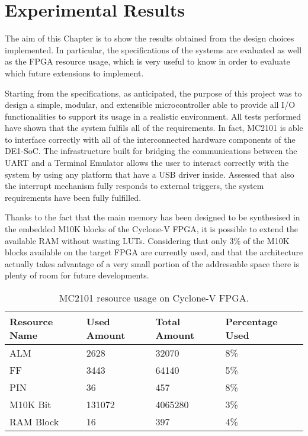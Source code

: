 \chapter{Experimental Results}
The aim of this Chapter is to show the results obtained from the design choices implemented. In particular, the specifications of the systems are evaluated as well as the FPGA resource usage, which is very useful to know in order to evaluate which future extensions to implement.

Starting from the specifications, as anticipated, the purpose of this project was to design a simple, modular, and extensible microcontroller able to provide all I/O functionalities to support its usage in a realistic environment. All tests performed have shown that the system fulfils all of the requirements. In fact, MC2101 is able to interface correctly with all of the interconnected hardware components of the DE1-SoC. The infrastructure built for bridging the communications between the UART and a Terminal Emulator allows the user to interact correctly with the system by using any platform that have a USB driver inside. Assessed that also the interrupt mechanism fully responds to external triggers, the system requirements have been fully fulfilled.

Thanks to the fact that the main memory has been designed to be synthesised in the embedded M10K blocks of the Cyclone-V FPGA, it is possible to extend the available RAM without wasting LUTs. Considering that only 3\% of the M10K blocks available on the target FPGA are currently used, and that the architecture actually takes advantage of a very small portion of the addressable space there is plenty of room for future developments.

\begin{table}
\centering
\begin{tabular}{| p{3cm} | p{2cm} | p{2cm} | p{2cm} |}
 \hline
 \textbf{Resource Name} & \textbf{Used Amount} & \textbf{Total Amount} & \textbf{Percentage Used}\\ \hline
 \hline\hline
 ALM & 2628 & 32070 & 8\% \\ 
 \hline
 FF & 3443 & 64140  & 5\% \\
 \hline
 PIN & 36 & 457  & 8\% \\
 \hline
 M10K Bit & 131072 & 4065280 & 3\% \\
 \hline
 RAM Block & 16 & 397 & 4\% \\
 \hline
\end{tabular}
\caption{MC2101 resource usage on Cyclone-V FPGA.}
\label{tab:res} %
\end{table}


